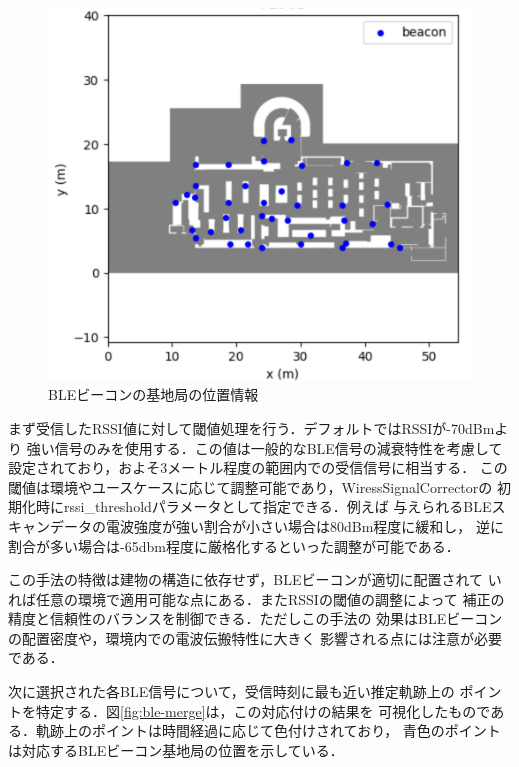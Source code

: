 \begin{figure}[H]
	\centering
	\includegraphics[width=\linewidth]{image/ble-beacon-position.jpg}
	\caption{BLEビーコンの基地局の位置情報}    \label{fig:ble-beacon-position}
\end{figure}

まず受信したRSSI値に対して閾値処理を行う．デフォルトではRSSIが-70dBmより
強い信号のみを使用する．この値は一般的なBLE信号の減衰特性を考慮して
設定されており，およそ3メートル程度の範囲内での受信信号に相当する．
この閾値は環境やユースケースに応じて調整可能であり，WiressSignalCorrectorの
初期化時にrssi\_thresholdパラメータとして指定できる．例えば
与えられるBLEスキャンデータの電波強度が強い割合が小さい場合は80dBm程度に緩和し，
逆に割合が多い場合は-65dbm程度に厳格化するといった調整が可能である．

この手法の特徴は建物の構造に依存せず，BLEビーコンが適切に配置されて
いれば任意の環境で適用可能な点にある．またRSSIの閾値の調整によって
補正の精度と信頼性のバランスを制御できる．ただしこの手法の
効果はBLEビーコンの配置密度や，環境内での電波伝搬特性に大きく
影響される点には注意が必要である．

次に選択された各BLE信号について，受信時刻に最も近い推定軌跡上の
ポイントを特定する．図\ref{fig:ble-merge}は，この対応付けの結果を
可視化したものである．軌跡上のポイントは時間経過に応じて色付けされており，
青色のポイントは対応するBLEビーコン基地局の位置を示している．

